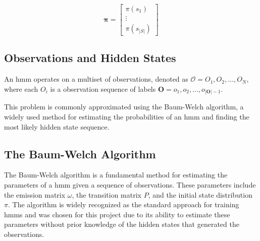\[
    \pmb{\pi} = \begin{bmatrix}
              \pi(s_1) \\
              \vdots   \\
              \pi(s_{|S|})
    \end{bmatrix}
\]

\subsection{Observations and Hidden States}\label{subsec:observations-hidden-states}





An \gls{hmm} operates on a multiset of observations, denoted as  $\mathcal{O} = {O_1, O_2, \ldots, O_N}$, where each $O_i$ is a observation sequence of labels $\mathbf{O} = o_1, o_2, \ldots, o_{|\mathbf{O}|-1}$.






This problem is commonly approximated using the Baum-Welch algorithm, a widely used method for estimating the probabilities of an \gls{hmm} and finding the most likely hidden state sequence.


\subsection{The Baum-Welch Algorithm}\label{subsec:baum-welch}
The Baum-Welch algorithm is a fundamental method for estimating the parameters of a \gls{hmm} given a sequence of observations.
These parameters include the emission matrix $\omega$, the transition matrix $P$, and the initial state distribution $\pi$.
The algorithm is widely recognized as the standard approach for training \glspl{hmm} and was chosen for this project due to its ability to estimate these parameters without prior knowledge of the hidden states that generated the observations.

